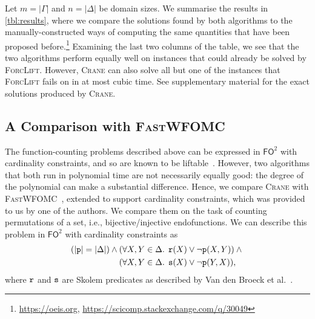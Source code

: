 \documentclass{article}
\newcommand{\FOtwo}{$\mathsf{FO}^{2}$}
\newcommand{\predicate}{\texttt{\textup{p}}}
\newcommand{\predicates}{\texttt{\textup{s}}}
\newcommand{\predicater}{\texttt{\textup{r}}}
\begin{document}
Let $m = |\Gamma|$ and $n = |\Delta|$ be domain sizes. We summarise the results
in \cref{tbl:results}, where we compare the solutions found by both algorithms
to the manually-constructed ways of computing the same quantities that have been
proposed before.\footnote{\url{https://oeis.org},
  \url{https://scicomp.stackexchange.com/q/30049}} Examining the last two
columns of the table, we see that the two algorithms perform equally well on
instances that could already be solved by \textsc{ForcLift}. However,
\textsc{Crane} can also solve all but one of the instances that
\textsc{ForcLift} fails on in at most cubic time. See supplementary material for
the exact solutions produced by \textsc{Crane}.

\subsection{A Comparison with \textsc{\normalfont FastWFOMC}}

The function-counting problems described above can be expressed in \FOtwo{} with
cardinality constraints, and so are known to be
liftable~\cite{DBLP:journals/jair/Kuzelka21}. However, two algorithms that both
run in polynomial time are not necessarily equally good: the degree of the
polynomial can make a substantial difference. Hence, we compare \textsc{Crane}
with \textsc{FastWFOMC}~\cite{DBLP:conf/uai/BremenK21}, extended to support
cardinality constraints, which was provided to us by one of the authors. We
compare them on the task of counting permutations of a set, i.e.,
bijective/injective endofunctions. We can describe this problem in \FOtwo{} with
cardinality constraints as
\begin{align*}
  (|\predicate| = |\Delta|) \land{} &(\forall X, Y \in \Delta\text{. } \predicater(X) \lor \neg \predicate(X, Y)) \land{}\\
  &(\forall X, Y \in \Delta\text{. } \predicates(X) \lor \neg\predicate(Y, X)),
\end{align*}
where $\predicater$ and $\predicates$ are Skolem predicates as described by Van
den Broeck et al.~.
\end{document}

